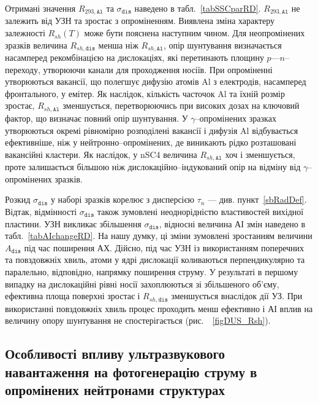Отримані значення $R_{293,\mathtt{Al}}$ та $\sigma_{\mathtt{dis}}$ наведено в табл.~\ref{tabSSCparRD}.
$R_{293,\mathtt{Al}}$ не залежить від УЗН та зростає з опроміненням.
Виявлена зміна характеру залежності $R_{sh}(T)$ може бути пояснена
наступним чином.
Для неопромінених зразків величина $R_{sh,\mathtt{dis}}$ менша ніж $R_{sh,\mathtt{Al}}$,  опір шунтування
визначається насамперед рекомбінацією на дислокаціях, які перетинають площину $p$---$n$--переходу,
утворюючи канали для проходження носіїв.
При опроміненні утворюються вакансії, що полегшує дифузію атомів Al з електродів, насамперед фронтального, у емітер.
Як наслідок, кількість часточок Al та їхній розмір зростає, $R_{sh,\mathtt{Al}}$ зменшується,
перетворюючись при високих дозах на ключовий фактор, що визначає повний  опір шунтування.
У $\gamma$--опромінених зразках утворюються окремі рівномірно розподілені вакансії і
дифузія Al відбувається ефективніше, ніж у нейтронно--опромінених, де
виникають рідко розташовані вакансійні кластери.
Як наслідок, у nSC4 величина $R_{sh,\mathtt{Al}}$ хоч і зменшується, проте залишається
більшою ніж дислокаційно--індукований опір на 
відміну від $\gamma$--опромінених зразків.

Розкид $\sigma_{\mathtt{dis}}$ у наборі зразків корелює з дисперсією $\tau_n$ --- див. пункт~\ref{sbRadDef}.
Відтак, відмінності $\sigma_{\mathtt{dis}}$ також зумовлені неоднорідністю
властивостей вихідної пластини.
УЗН викликає збільшення $\sigma_{\mathtt{dis}}$, відносні величина АІ змін
наведено в табл.~\ref{tabAIchangeRD}.
На нашу думку, ці зміни зумовлені зростанням величини $A_\mathtt{dis}$ під час поширення АХ.
Дійсно, під час УЗН із використанням поперечних та повздовжніх хвиль,
атоми у ядрі дислокації коливаються перпендикулярно та паралельно, відповідно, напрямку поширення струму.
У результаті в першому випадку на дислокаційні рівні носії захоплюються зі збільшеного об'єму,
ефективна площа поверхні зростає і $R_{sh,\mathtt{dis}}$ зменшується внаслідок дії УЗ.
При використанні повздовжніх хвиль процес проходить менш ефективно і АІ вплив на величину
 опору шунтування не спостерігається (рис.~~\ref{figDUS_Rsh}).

\subsection{Особливості впливу ультразвукового навантаження на фотогенерацію струму в опромінених нейтронами структурах\label{sbNIsc}}

